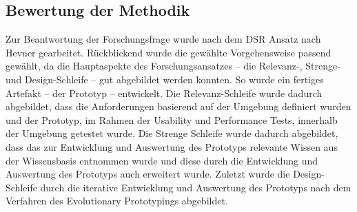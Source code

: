 \subsection{Bewertung der Methodik}
Zur Beantwortung der Forschungsfrage wurde nach dem \ac{DSR} Ansatz nach Hevner \cite{Hevner2004} gearbeitet. Rückblickend wurde die gewählte Vorgehensweise passend gewählt, da die Hauptaspekte des Forschungsansatzes – die Relevanz-, Strenge- und Design-Schleife – gut abgebildet werden konnten. So wurde ein fertiges Artefakt – der Prototyp – entwickelt. Die Relevanz-Schleife wurde dadurch abgebildet, dass die Anforderungen basierend auf der Umgebung definiert wurden und der Prototyp, im Rahmen der Usability und Performance Tests, innerhalb der Umgebung getestet wurde. Die Strenge Schleife wurde dadurch abgebildet, dass das zur Entwicklung und Auswertung des Prototyps relevante Wissen aus der Wissensbasis entnommen wurde und diese durch die Entwicklung und Auswertung des Prototyps auch erweitert wurde. Zuletzt wurde die Design-Schleife durch die iterative Entwicklung und Auswertung des Prototyps nach dem Verfahren des Evolutionary Prototypings abgebildet.
